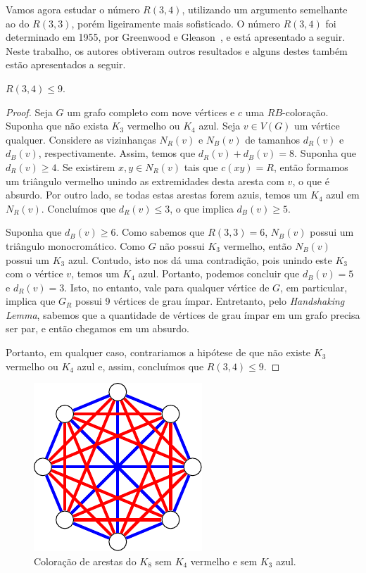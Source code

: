 Vamos agora estudar o número $R(3,4)$, utilizando um argumento semelhante ao do $R(3,3)$, porém ligeiramente mais sofisticado. O número $R(3,4)$ foi determinado em 1955, por Greenwood e Gleason~\cite{greenwood}, e está apresentado a seguir. Neste trabalho, os autores obtiveram outros resultados e alguns destes também estão apresentados a seguir.

\begin{proposition}
\label{prelim:thm:r34}
$R(3,4) \leq 9$.
\end{proposition}
\begin{proof}
Seja $G$ um grafo completo com nove vértices e $c$ uma $RB$-coloração.
Suponha que não exista $K_3$ vermelho ou $K_4$ azul. Seja $v \in V(G)$ um vértice qualquer. Considere as vizinhanças $N_R(v)$ e $N_B(v)$ de tamanhos $d_R(v)$ e $d_B(v)$, respectivamente. Assim, temos que $d_R(v) + d_B(v) = 8$. Suponha que $d_R(v) \geq 4$. Se existirem $x,y \in N_R(v)$ tais que $c(xy) = R$, então formamos um triângulo vermelho unindo as extremidades desta aresta com $v$, o que é absurdo. Por outro lado, se todas estas arestas forem azuis, temos um $K_4$ azul em $N_R(v)$. Concluímos que $d_R(v) \leq 3$, o que implica $d_B(v) \geq 5$.

Suponha que $d_B(v) \geq 6$. Como sabemos que $R(3,3) = 6$, $N_B(v)$ possui um triângulo monocromático. Como $G$ não possui $K_3$ vermelho, então $N_B(v)$ possui um $K_3$ azul. Contudo, isto nos dá uma contradição, pois unindo este $K_3$ com o vértice $v$, temos um $K_4$ azul. Portanto, podemos concluir que $d_B(v) = 5$ e $d_R(v) = 3$. Isto, no entanto, vale para qualquer vértice de $G$, em particular, implica que $G_R$ possui 9 vértices de grau ímpar.
Entretanto, pelo \emph{Handshaking Lemma}, sabemos que a quantidade de vértices de grau ímpar em um grafo precisa ser par, e então chegamos em um absurdo.

Portanto, em qualquer caso, contrariamos a hipótese de que não existe $K_3$ vermelho ou $K_4$ azul e, assim, concluímos que $R(3,4) \leq 9$.
\end{proof}

\begin{figure}[ht!]
\centering
\includegraphics{figures/2_prelim_1_r34lb}
\caption{Coloração de arestas do $K_8$ sem $K_4$ vermelho e sem $K_3$ azul.}
\label{prelim:fig:exr34}
\end{figure}

